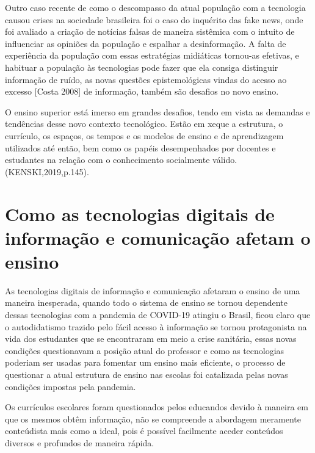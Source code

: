 \documentclass[article, 11pt, oneside, a4paper, english, brazil, sumario=tradicional]{abntex2}
\begin{document}
    Outro caso recente de como o descompasso da atual população com a tecnologia causou
crises na sociedade brasileira foi o caso do inquérito das fake news, onde foi avaliado
a criação de notícias falsas de maneira sistêmica com o intuito de influenciar as opiniões
da população e espalhar a desinformação. A falta de experiência da população com essas
estratégias midiáticas tornou-as efetivas, e habituar a população às tecnologias pode fazer que
ela consiga distinguir informação de ruído, as novas questões epistemológicas vindas do acesso ao excesso [Costa 2008]
de informação, também são desafios no novo ensino.

\begin{citacao}
O ensino superior está imerso em grandes desafios, tendo em vista as demandas e tendências desse novo contexto tecnológico. Estão em xeque a estrutura, o currículo, os  espaços,  os  tempos  e  os  modelos  de  ensino  e  de  aprendizagem  utilizados  até então,  bem como  os  papéis  desempenhados  por  docentes  e  estudantes  na  relação com o conhecimento socialmente válido. (KENSKI,2019,p.145).
\end{citacao}

\section{Como as tecnologias digitais de informação e comunicação afetam o ensino}
    As tecnologias digitais de informação e comunicação afetaram o ensino
de uma maneira inesperada, quando todo o sistema de ensino se tornou dependente dessas tecnologias
com a pandemia de COVID-19 atingiu o Brasil, ficou claro que o autodidatismo trazido pelo fácil
acesso à informação se tornou protagonista na vida dos estudantes que se encontraram em meio a crise
sanitária, essas novas condições questionavam a posição atual do professor e como as tecnologias poderiam ser usadas
para fomentar um ensino mais eficiente, o processo de questionar a atual estrutura de ensino nas escolas foi
catalizada pelas novas condições impostas pela pandemia.

    Os currículos escolares foram questionados pelos educandos devido à maneira
em que os mesmos obtêm informação, não se compreende a abordagem meramente
conteúdista mais como a ideal, pois é possível facilmente aceder conteúdos
diversos e profundos de maneira rápida.
\end{document}
